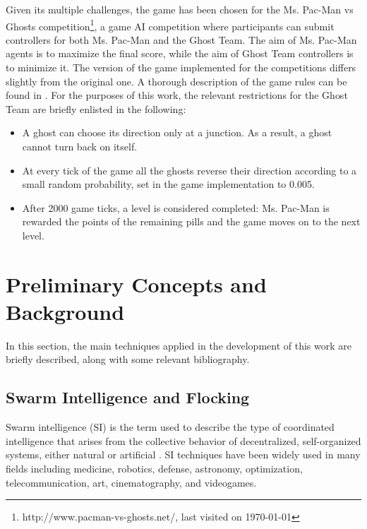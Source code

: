 \documentclass{llncs}
\begin{document}
Given its multiple challenges, the game has been chosen for the Ms. Pac-Man vs Ghosts competition\footnote{http://www.pacman-vs-ghosts.net/, last visited on \today}, a game AI competition where participants can submit controllers for both Ms. Pac-Man and the Ghost Team. The aim of Ms. Pac-Man agents is to maximize the final score, while the aim of Ghost Team controllers is to minimize it. The version of the game implemented for the competitions differs slightly from the original one. A thorough description of the game rules can be found in \cite{MsPacManVSGhost2011}. For the purposes of this work, the relevant restrictions for the Ghost Team are briefly enlisted in the following:
\begin{itemize}
  \item A ghost can choose its direction only at a junction. As a result, a ghost cannot turn back on itself.
  \item At every tick of the game all the ghosts reverse their direction according to a small random probability, set in the game implementation to 0.005.
  \item After 2000 game ticks, a level is considered completed: Ms. Pac-Man is rewarded the points of the remaining pills and the game moves on to the next level.
\end{itemize}

%
%
\section{Preliminary Concepts and Background}
\label{sec:preliminaryconcepts_sota}

In this section, the main techniques applied in the development of this work are briefly described, along with some relevant bibliography.

\subsection{Swarm Intelligence and Flocking}
\label{subsec:FSMs}

Swarm intelligence (SI) is the term used to describe the type of coordinated intelligence that arises from the collective behavior of decentralized, self-organized systems, either natural or artificial \cite{BeniWang89}. SI techniques have been widely used in many fields including medicine, robotics, defense, astronomy, optimization, telecommunication, art, cinematography, and videogames.
\end{document}
